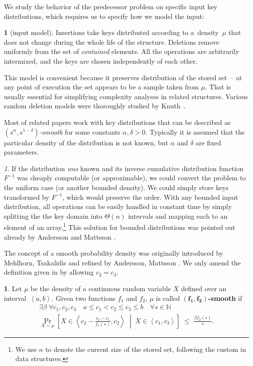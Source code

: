 \documentclass[
submission
]{dmtcs-episciences}
\theoremstyle{plain}
\theoremstyle{definition}
\newtheorem{defn}[thm]{\protect\definitionname}
\theoremstyle{remark}
\newtheorem*{rem*}{\protect\remarkname}
\theoremstyle{plain}
\theoremstyle{plain}
\providecommand{\definitionname}{Definition}
\providecommand{\remarkname}{Remark}
\def\interval#1#2{\left\langle#1,#2\right\rangle}
\def\lespaces{\;\le\;}
\def\ProbParam#1#2{\Pr_{#1}\!\left[#2\right]}
\def\natural{\mathbb{N}}
\def\emphDef#1{{\bf#1}}
\def\emphDefMath#1{\mathbf{#1}}
\begin{document}
We study the behavior of the predecessor problem on specific input
key distributions, which requires us to specify how we model the input:
\begin{defn}[input model]
Insertions take keys distributed according to a~density~$\mu$ that
does not change during the whole life of the structure. Deletions
remove uniformly from the set of \emph{contained} elements. All the
operations are arbitrarily intermixed, and the keys are chosen independently
of each other.
\end{defn}
This model is convenient because it preserves distribution of the
stored set~– at any point of execution the set appears to be a sample
taken from $\mu$. That is usually essential for simplifying complexity
analyses in related structures. Various random deletion models were
thoroughly studied by Knuth~\cite{Knuth77}.

Most of related papers work with key distributions that can be described
as \emph{$\left(s^{\alpha},s^{1-\delta}\right)$-smooth} for some
constants $\alpha,\delta>0$. Typically it is assumed that the particular
density of the distribution is not known, but $\alpha$ and $\delta$
are fixed parameters.
\begin{rem*}
If the distribution \emph{was} known and its inverse cumulative distribution
function $F^{-1}$ was cheaply computable (or approximable), we could
convert the problem to the uniform case (or another bounded density).
We could simply store keys transformed by $F^{-1}$, which would preserve
the order. With any bounded input distribution, all operations can
be easily handled in constant time by simply splitting the the key
domain into $\Theta(n)$ intervals and mapping each to an element
of an array.\footnote{We use $n$ to denote the current size of the stored set, following
the custom in data structures.} This solution for bounded distributions was pointed out already by
Andersson and Mattsson \cite[sec. 5.2]{AndersM93}.
\end{rem*}
The concept of a smooth probability density was originally introduced by Mehlhorn, Tsakalidis \cite{MehlT93} and refined by Andersson, Mattsson \cite{AndersM93}. We only amend the definition given in \cite{AndersM93,KMSTTZ06} by allowing $c_2 = c_3$.
\begin{defn}%
 \label{def:smooth}
	Let $\mu$ be the density of a continuous random variable $X$ defined over an interval~$\interval a b$. Given two functions $f_1$ and $f_2$, $\mu$ is called \emphDef{$\emphDefMath{(f_1,f_2)}$-smooth} if
	\begin{multline*}
		\exists\beta \; \forall c_1,c_2,c_3 \quad a \le c_1 < c_2 \le c_3 \le b \quad \forall s \in \natural \\
		\ProbParam{X \sim \mu}{  X \in \interval{ c_2 - \frac{c_3-c_1}{f_1(s)} }{c_2} \; \middle| \; X \in \interval{c_1}{c_3}  }
		\lespaces \frac{\beta f_2(s)}{s}.
	\end{multline*}
\end{defn}
\end{document}
